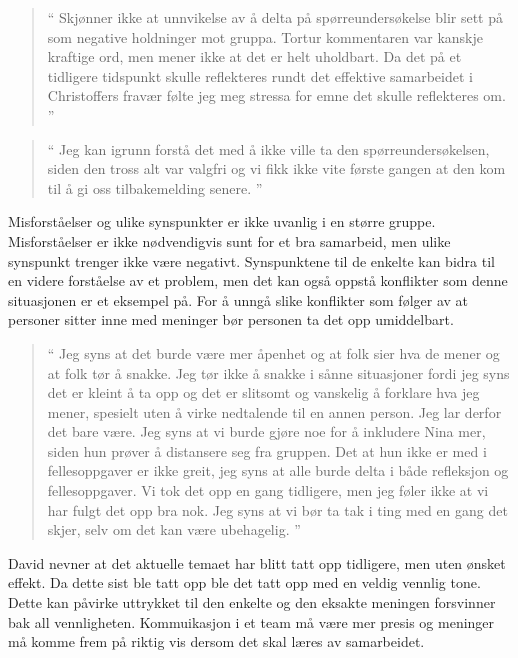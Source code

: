 \begin{quote}``
Skjønner ikke at unnvikelse av å delta på spørreundersøkelse blir sett på som negative holdninger mot gruppa. 
Tortur kommentaren var kanskje kraftige ord, men mener ikke at det er helt uholdbart. Da det på et tidligere tidspunkt skulle
reflekteres rundt det effektive samarbeidet i Christoffers fravær følte jeg meg stressa for emne det skulle reflekteres om.
''\end{quote} 

\begin{quote}``
Jeg kan igrunn forstå det med å ikke ville ta den spørreundersøkelsen, siden den 
tross alt var valgfri og vi fikk ikke vite første gangen at den kom til å gi oss tilbakemelding senere.
''\end{quote} 

Misforståelser og ulike synspunkter er ikke uvanlig i en større gruppe. Misforståelser er ikke nødvendigvis sunt for
et bra samarbeid, men ulike synspunkt trenger ikke være negativt. Synspunktene til de enkelte kan bidra til en videre
forståelse av et problem, men det kan også oppstå konflikter som denne situasjonen er et eksempel på.
For å unngå slike konflikter som følger av at personer sitter inne med meninger bør personen ta det opp umiddelbart.

\begin{quote}``
Jeg syns at det burde være mer åpenhet og at folk sier hva de 
mener og at folk tør å snakke. Jeg tør ikke å snakke i sånne situasjoner fordi jeg syns det er kleint å ta opp og det 
er slitsomt og vanskelig å forklare hva jeg mener, spesielt uten å virke nedtalende til en annen person. Jeg lar derfor
det bare være. Jeg syns at vi burde gjøre noe for å inkludere Nina mer, siden hun prøver å distansere seg fra gruppen. 
Det at hun ikke er med i fellesoppgaver er ikke greit, jeg syns at alle burde delta i både refleksjon og 
fellesoppgaver. Vi tok det opp en gang tidligere, men jeg føler ikke at vi har fulgt det opp bra nok. Jeg syns at vi bør 
ta tak i ting med en gang det skjer, selv om det kan være ubehagelig.
''\end{quote} 

David nevner at det aktuelle temaet har blitt tatt opp tidligere, men uten ønsket effekt. Da dette sist ble tatt opp ble
det tatt opp med en veldig vennlig tone. Dette kan påvirke uttrykket til den enkelte og den eksakte meningen 
forsvinner bak all vennligheten. Kommuikasjon i et team må være mer presis og meninger må komme frem på
riktig vis dersom det skal læres av samarbeidet.  

